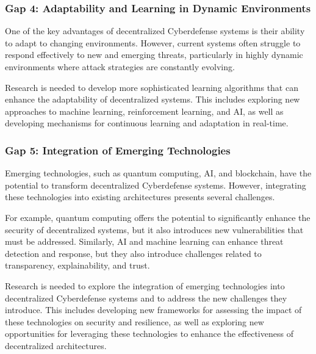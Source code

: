 \subsubsection{Gap 4: Adaptability and Learning in Dynamic Environments}

One of the key advantages of decentralized Cyberdefense systems is their ability to adapt to changing environments. However, current systems often struggle to respond effectively to new and emerging threats, particularly in highly dynamic environments where attack strategies are constantly evolving.

Research is needed to develop more sophisticated learning algorithms that can enhance the adaptability of decentralized systems. This includes exploring new approaches to machine learning, reinforcement learning, and AI, as well as developing mechanisms for continuous learning and adaptation in real-time.

\subsubsection{Gap 5: Integration of Emerging Technologies}

Emerging technologies, such as quantum computing, AI, and blockchain, have the potential to transform decentralized Cyberdefense systems. However, integrating these technologies into existing architectures presents several challenges.

For example, quantum computing offers the potential to significantly enhance the security of decentralized systems, but it also introduces new vulnerabilities that must be addressed. Similarly, AI and machine learning can enhance threat detection and response, but they also introduce challenges related to transparency, explainability, and trust.

Research is needed to explore the integration of emerging technologies into decentralized Cyberdefense systems and to address the new challenges they introduce. This includes developing new frameworks for assessing the impact of these technologies on security and resilience, as well as exploring new opportunities for leveraging these technologies to enhance the effectiveness of decentralized architectures.



